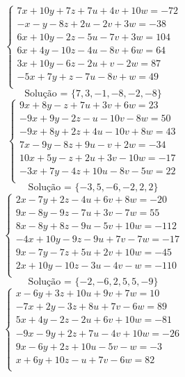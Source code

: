 \documentclass[12pt,oneside,a4paper]{article}
\begin{document}
\vspace{\baselineskip}
\begin{equation*}
\begin{cases}
7x+10y+7z+7u+4v+10w=-72 \\
-x-y-8z+2u-2v+3w=-38 \\
6x+10y-2z-5u-7v+3w=104 \\
6x+4y-10z-4u-8v+6w=64 \\
3x+10y-6z-2u+v-2w=87 \\
-5x+7y+z-7u-8v+w=49 \\
\end{cases}
\end{equation*}
\begin{equation*}
\text{Solução = }\{7,3,-1,-8,-2,-8\}
\end{equation*}
\vspace{\baselineskip}
\begin{equation*}
\begin{cases}
9x+8y-z+7u+3v+6w=23 \\
-9x+9y-2z-u-10v-8w=50 \\
-9x+8y+2z+4u-10v+8w=43 \\
7x-9y-8z+9u-v+2w=-34 \\
10x+5y-z+2u+3v-10w=-17 \\
-3x+7y-4z+10u-8v-5w=22 \\
\end{cases}
\end{equation*}
\begin{equation*}
\text{Solução = }\{-3,5,-6,-2,2,2\}
\end{equation*}
\vspace{\baselineskip}
\begin{equation*}
\begin{cases}
2x-7y+2z-4u+6v+8w=-20 \\
9x-8y-9z-7u+3v-7w=55 \\
8x-8y+8z-9u-5v+10w=-112 \\
-4x+10y-9z-9u+7v-7w=-17 \\
9x-7y-7z+5u+2v+10w=-45 \\
2x+10y-10z-3u-4v-w=-110 \\
\end{cases}
\end{equation*}
\begin{equation*}
\text{Solução = }\{-2,-6,2,5,5,-9\}
\end{equation*}
\vspace{\baselineskip}
\begin{equation*}
\begin{cases}
x-6y+3z+10u+9v+7w=10 \\
-7x+2y-3z+8u+7v-6w=89 \\
5x+4y-2z-2u+6v+10w=-81 \\
-9x-9y+2z+7u-4v+10w=-26 \\
9x-6y+2z+10u-5v-w=-3 \\
x+6y+10z-u+7v-6w=82 \\
\end{cases}
\end{equation*}
\end{document}
